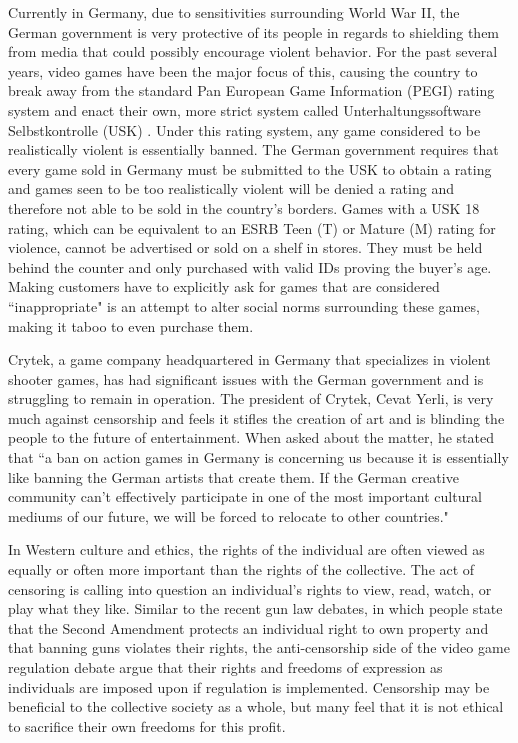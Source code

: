 Currently in Germany, due to sensitivities surrounding World War II, the German government is very protective of its people in regards to shielding them from media that could possibly encourage violent behavior. For the past several years, video games have been the major focus of this, causing the country to break away from the standard Pan European Game Information (PEGI) rating system \cite{pegi} and enact their own, more strict system called Unterhaltungssoftware Selbstkontrolle (USK) \cite{usk}. Under this rating system, any game considered to be realistically violent is essentially banned. The German government requires that every game sold in Germany must be submitted to the USK to obtain a rating and games seen to be too realistically violent will be denied a rating and therefore not able to be sold in the country's borders. Games with a USK 18 rating, which can be equivalent to an ESRB Teen (T) or Mature (M) rating for violence, cannot be advertised or sold on a shelf in stores. They must be held behind the counter and only purchased with valid IDs proving the buyer's age. Making customers have to explicitly ask for games that are considered ``inappropriate" is an attempt to alter social norms surrounding these games, making it taboo to even purchase them.

Crytek, a game company headquartered in Germany that specializes in violent shooter games, has had significant issues with the German government and is struggling to remain in operation. The president of Crytek, Cevat Yerli, is very much against censorship and feels it stifles the creation of art and is blinding the people to the future of entertainment. When asked about the matter, he stated that ``a ban on action games in Germany is concerning us because it is essentially like banning the German artists that create them. If the German creative community can't effectively participate in one of the most important cultural mediums of our future, we will be forced to relocate to other countries." \cite{yerli}


In Western culture and ethics, the rights of the individual are often viewed as equally or often more important than the rights of the collective. The act of censoring is calling into question an individual's rights to view, read, watch, or play what they like. Similar to the recent gun law debates, in which people state that the Second Amendment protects an individual right to own property and that banning guns violates their rights, the anti-censorship side of the video game regulation debate argue that their rights and freedoms of expression as individuals are imposed upon if regulation is implemented. Censorship may be beneficial to the collective society as a whole, but many feel that it is not ethical to sacrifice their own freedoms for this profit. 

